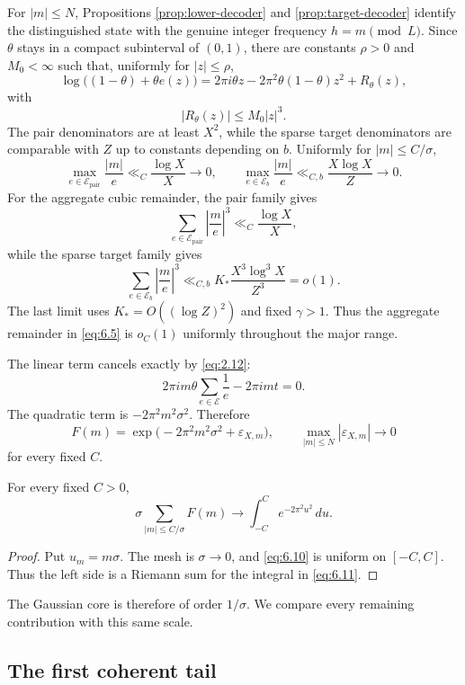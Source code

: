For $|m|\le N$, Propositions \ref{prop:lower-decoder} and \ref{prop:target-decoder} identify the distinguished state with the genuine integer frequency $h=m\pmod L$. Since $\theta$ stays in a compact subinterval of $(0,1)$, there are constants $\rho>0$ and $M_0<\infty$ such that, uniformly for $|z|\le\rho$,
\[
\log\bigl((1-\theta)+\theta e(z)\bigr)
=
2\pi i\theta z
-2\pi^2\theta(1-\theta)z^2
+R_\theta(z),
\tag{6.5}\label{eq:6.5}
\]
with
\[
|R_\theta(z)|\le M_0|z|^3.
\tag{6.6}\label{eq:6.6}
\]
The pair denominators are at least $X^2$, while the sparse target denominators are comparable with $Z$ up to constants depending on $b$. Uniformly for $|m|\le C/\sigma$,
\[
\max_{e\in\mathcal E_{\mathrm{pair}}}\frac{|m|}{e}
\ll_C\frac{\log X}{X}\to0,
\qquad
\max_{e\in\mathcal E_b}\frac{|m|}{e}
\ll_{C,b}\frac{X\log X}{Z}\to0.
\tag{6.7}\label{eq:6.7}
\]
For the aggregate cubic remainder, the pair family gives
\[
\sum_{e\in\mathcal E_{\mathrm{pair}}}
\left|\frac{m}{e}\right|^3
\ll_C\frac{\log X}{X},
\]
while the sparse target family gives
\[
\sum_{e\in\mathcal E_b}
\left|\frac{m}{e}\right|^3
\ll_{C,b}
K_*\frac{X^3\log^3X}{Z^3}
=o(1).
\tag{6.8}\label{eq:6.8}
\]
The last limit uses $K_*=O((\log Z)^2)$ and fixed $\gamma>1$. Thus the aggregate remainder in \eqref{eq:6.5} is $o_C(1)$ uniformly throughout the major range.

The linear term cancels exactly by \eqref{eq:2.12}:
\[
2\pi i m\theta\sum_{e\in\mathcal E}\frac1e
-2\pi i mt=0.
\tag{6.9}\label{eq:6.9}
\]
The quadratic term is $-2\pi^2m^2\sigma^2$. Therefore
\[
F(m)
=
\exp\bigl(-2\pi^2m^2\sigma^2+\varepsilon_{X,m}\bigr),
\qquad
\max_{|m|\le N}|\varepsilon_{X,m}|
\longrightarrow0
\tag{6.10}\label{eq:6.10}
\]
for every fixed $C$.

\begin{proposition}\label{prop:normalized-major}
For every fixed $C>0$,
\[
\sigma
\sum_{|m|\le C/\sigma}F(m)
\longrightarrow
\int_{-C}^{C}e^{-2\pi^2u^2}\,du.
\tag{6.11}\label{eq:6.11}
\]
\end{proposition}

\begin{proof}
Put $u_m=m\sigma$. The mesh is $\sigma\to0$, and \eqref{eq:6.10} is uniform on $[-C,C]$. Thus the left side is a Riemann sum for the integral in \eqref{eq:6.11}.
\end{proof}

The Gaussian core is therefore of order $1/\sigma$. We compare every remaining contribution with this same scale.

\subsection{The first coherent tail}

